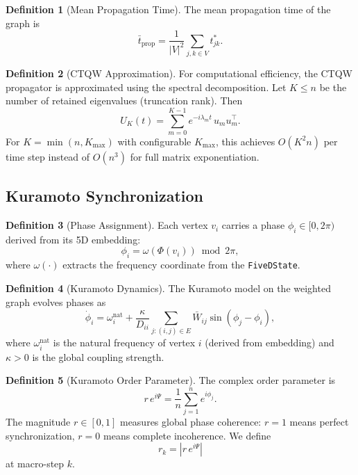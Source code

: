 \documentclass[11pt,a4paper,twoside]{article}
\theoremstyle{definition}
\newtheorem{definition}{Definition}[section]
\theoremstyle{plain}
\theoremstyle{remark}
\begin{document}
\begin{definition}[Mean Propagation Time]\label{def:meanprop}
The mean propagation time of the graph is
\[
  \bar{t}_{\mathrm{prop}} = \frac{1}{|V|^2} \sum_{j,k \in V} t^*_{jk}.
\]
\end{definition}

\begin{definition}[CTQW Approximation]\label{def:ctqwapprox}
For computational efficiency, the CTQW propagator is approximated using
the spectral decomposition. Let $K \le n$ be the number of retained
eigenvalues (truncation rank). Then
\[
  U_K(t) = \sum_{m=0}^{K-1} e^{-i\lambda_m t}\, u_m u_m^\top.
\]
For $K = \min(n, K_{\max})$ with configurable $K_{\max}$, this
achieves $O(K^2 n)$ per time step instead of $O(n^3)$ for full
matrix exponentiation.
\end{definition}


\subsection{Kuramoto Synchronization}

\begin{definition}[Phase Assignment]\label{def:phaseassign}
Each vertex $v_i$ carries a phase $\phi_i \in [0, 2\pi)$ derived from
its 5D embedding:
\[
  \phi_i = \omega(\Phi(v_i)) \bmod 2\pi,
\]
where $\omega(\cdot)$ extracts the frequency coordinate from the
\texttt{FiveDState}.
\end{definition}

\begin{definition}[Kuramoto Dynamics]\label{def:kuramoto}
The Kuramoto model on the weighted graph evolves phases as
\[
  \dot{\phi}_i = \omega_i^{\mathrm{nat}} + \frac{\kappa}{D_{ii}}
  \sum_{j: (i,j) \in E} \bar{W}_{ij} \sin(\phi_j - \phi_i),
\]
where $\omega_i^{\mathrm{nat}}$ is the natural frequency of vertex $i$
(derived from embedding) and $\kappa > 0$ is the global coupling
strength.
\end{definition}

\begin{definition}[Kuramoto Order Parameter]\label{def:orderparameter}
The complex order parameter is
\[
  r\, e^{i\Psi} = \frac{1}{n} \sum_{j=1}^{n} e^{i\phi_j}.
\]
The magnitude $r \in [0,1]$ measures global phase coherence:
$r = 1$ means perfect synchronization, $r = 0$ means complete
incoherence. We define
\[
  r_k = |r\, e^{i\Psi}|
\]
at macro-step $k$.
\end{definition}
\end{document}
